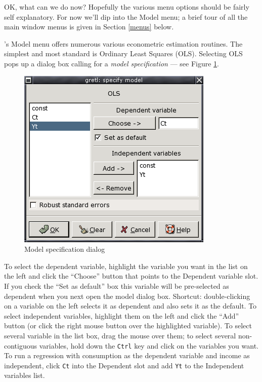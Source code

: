 OK, what can we do now?  Hopefully the various menu options should be
fairly self explanatory.  For now we'll dip into the Model menu; a
brief tour of all the main window menus is given in Section
\ref{menus} below.
    
's Model menu offers numerous various econometric
estimation routines.  The simplest and most standard is Ordinary Least
Squares (OLS). Selecting OLS pops up a dialog box calling for a
\emph{model specification} --- see Figure \ref{fig-selector}.
    
\begin{figure}[htbp]
  \caption{Model specification dialog}
  \label{fig-selector}
  \begin{center}
    \includegraphics[scale=0.5]{figures/selector}
  \end{center}
\end{figure}

To select the dependent variable, highlight the variable you want in
the list on the left and click the ``Choose'' button that points to
the Dependent variable slot.  If you check the ``Set as default'' box
this variable will be pre-selected as dependent when you next open the
model dialog box. Shortcut: double-clicking on a variable on the left
selects it as dependent and also sets it as the default. To select
independent variables, highlight them on the left and click the
``Add'' button (or click the right mouse button over the highlighted
variable).  To select several variable in the list box, drag the mouse
over them; to select several non-contiguous variables, hold down the
\verb+Ctrl+ key and click on the variables you want.  To run a
regression with consumption as the dependent variable and income as
independent, click \verb+Ct+ into the Dependent slot and add \verb+Yt+
to the Independent variables list.

